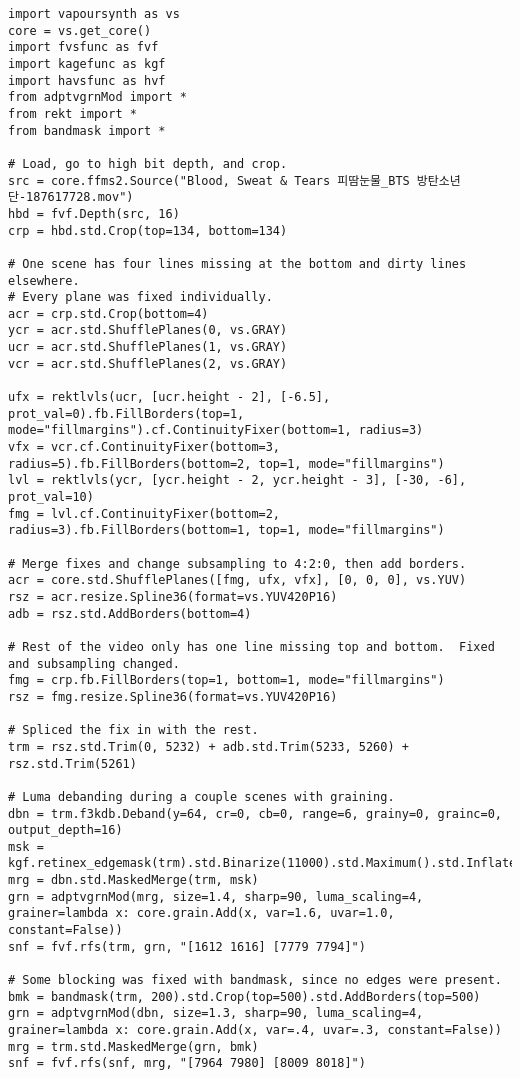 \documentclass{scrartcl}
\begin{document}
\begin{lstlisting}
import vapoursynth as vs
core = vs.get_core()
import fvsfunc as fvf
import kagefunc as kgf
import havsfunc as hvf
from adptvgrnMod import *
from rekt import *
from bandmask import *

# Load, go to high bit depth, and crop.
src = core.ffms2.Source("Blood, Sweat & Tears 피땀눈물_BTS 방탄소년단-187617728.mov")
hbd = fvf.Depth(src, 16)
crp = hbd.std.Crop(top=134, bottom=134)

# One scene has four lines missing at the bottom and dirty lines elsewhere.
# Every plane was fixed individually.
acr = crp.std.Crop(bottom=4)
ycr = acr.std.ShufflePlanes(0, vs.GRAY)
ucr = acr.std.ShufflePlanes(1, vs.GRAY)
vcr = acr.std.ShufflePlanes(2, vs.GRAY)

ufx = rektlvls(ucr, [ucr.height - 2], [-6.5], prot_val=0).fb.FillBorders(top=1, mode="fillmargins").cf.ContinuityFixer(bottom=1, radius=3)
vfx = vcr.cf.ContinuityFixer(bottom=3, radius=5).fb.FillBorders(bottom=2, top=1, mode="fillmargins")
lvl = rektlvls(ycr, [ycr.height - 2, ycr.height - 3], [-30, -6], prot_val=10)
fmg = lvl.cf.ContinuityFixer(bottom=2, radius=3).fb.FillBorders(bottom=1, top=1, mode="fillmargins")

# Merge fixes and change subsampling to 4:2:0, then add borders.
acr = core.std.ShufflePlanes([fmg, ufx, vfx], [0, 0, 0], vs.YUV)
rsz = acr.resize.Spline36(format=vs.YUV420P16)
adb = rsz.std.AddBorders(bottom=4)

# Rest of the video only has one line missing top and bottom.  Fixed and subsampling changed.
fmg = crp.fb.FillBorders(top=1, bottom=1, mode="fillmargins")
rsz = fmg.resize.Spline36(format=vs.YUV420P16)

# Spliced the fix in with the rest.
trm = rsz.std.Trim(0, 5232) + adb.std.Trim(5233, 5260) + rsz.std.Trim(5261)

# Luma debanding during a couple scenes with graining.
dbn = trm.f3kdb.Deband(y=64, cr=0, cb=0, range=6, grainy=0, grainc=0, output_depth=16)
msk = kgf.retinex_edgemask(trm).std.Binarize(11000).std.Maximum().std.Inflate()
mrg = dbn.std.MaskedMerge(trm, msk)
grn = adptvgrnMod(mrg, size=1.4, sharp=90, luma_scaling=4, grainer=lambda x: core.grain.Add(x, var=1.6, uvar=1.0, constant=False))
snf = fvf.rfs(trm, grn, "[1612 1616] [7779 7794]")

# Some blocking was fixed with bandmask, since no edges were present.
bmk = bandmask(trm, 200).std.Crop(top=500).std.AddBorders(top=500)
grn = adptvgrnMod(dbn, size=1.3, sharp=90, luma_scaling=4, grainer=lambda x: core.grain.Add(x, var=.4, uvar=.3, constant=False))
mrg = trm.std.MaskedMerge(grn, bmk)
snf = fvf.rfs(snf, mrg, "[7964 7980] [8009 8018]")


\end{lstlisting}
\end{document}
